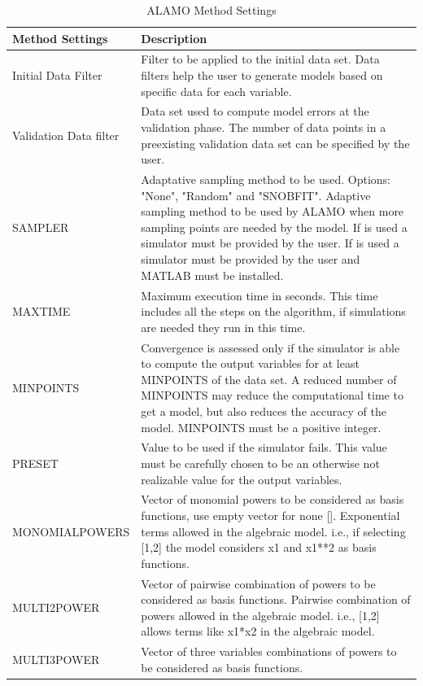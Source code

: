 \begin{center}

\begin{longtable}{|p{}|p{} |}
\caption{ALAMO Method Settings}
\label{tutorial.alamo.table} \\

		\hline
			\textbf{Method Settings} & \textbf{Description} \\		\hline
			Initial Data Filter & Filter to be applied to the initial data set. Data filters help the user to generate models based on specific data for each variable.  \\	\hline
			Validation Data filter & Data set used to compute model errors at the validation phase. The number of data points in a preexisting validation data set can be specified by the user.\\	\hline
			SAMPLER & Adaptative sampling method to be used. Options: "None", "Random" and "SNOBFIT". Adaptive sampling method to be used by ALAMO when more sampling points are needed by the model. If \bu{Random} is used a simulator must be provided by the user. If \bu{SNOBFIT} is used a simulator must be provided by the user and MATLAB must be installed.\\	\hline
			MAXTIME& Maximum execution time in seconds. This time includes all the steps on the algorithm, if simulations are needed they run in this time.\\	\hline
			MINPOINTS& Convergence is assessed only if the simulator is able to compute the output variables for at least MINPOINTS of the data set. A reduced number of MINPOINTS may reduce the computational time to get a model, but also reduces the accuracy of the model. MINPOINTS must be a positive integer. \\ \hline
			PRESET&Value to be used if the simulator fails. This value must be carefully chosen to be an otherwise not realizable value for the output variables.\\ \hline
			MONOMIALPOWERS &  Vector of monomial powers to be considered as basis functions, use empty vector for none []. Exponential terms allowed in the algebraic model.  i.e., if selecting [1,2] the model considers x1 and x1**2 as basis functions. \\ \hline
			MULTI2POWER & Vector of pairwise combination of powers to be considered as basis functions. Pairwise combination of powers allowed in the algebraic model. i.e., [1,2] allows terms like x1*x2 in the algebraic model.\\ \hline
			MULTI3POWER & Vector of three variables combinations of powers to be considered as basis functions. \\ \hline

\end{longtable}
\end{center}
